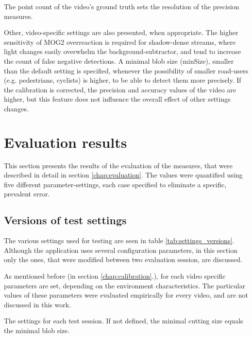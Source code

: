 The point count of the video's ground truth sets the resolution of the precision measures.

Other, video-specific settings are also presented, when appropriate.
The higher sensitivity of MOG2 overreaction is required for shadow-dense streams, where light changes easily overwhelm the background-subtractor, and tend to increase the count of false negative detections.
A minimal blob size (minSize), smaller than the default setting is specified, whenever the possibility of smaller road-users (e.g. pedestrians, cyclists) is higher, to be able to detect them more precisely.
If the calibration is corrected, the precision and accuracy values of the video are higher, but this feature does not influence the overall effect of other settings changes. 
\FloatBarrier

\section{Evaluation results}
This section presents the results of the evaluation of the measures, that were described in detail in section \ref{chap:evaluation}.
The values were quantified using five different parameter-settings, each case specified to eliminate a specific, prevalent error.

\subsection{Versions of test settings}
The various settings used for testing are seen in table \ref{tab:settings_versions}.
Although the application uses several configuration parameters, in this section only the ones, that were modified between two evaluation session, are discussed.

As mentioned before (in section \ref{chap:calibration}.), for each video specific parameters are set, depending on the environment characteristics.
The particular values of these parameters were evaluated empirically for every video, and are not discussed in this work.

\begin{table}[!h]
	\begin{adjustbox}{center}
	\end{adjustbox}
	\caption{The settings for each test session. If not defined, the minimal cutting size equals the minimal blob size.}
	\label{tab:settings_versions}
\end{table}


